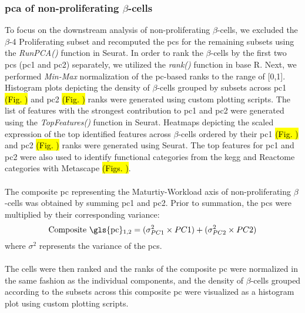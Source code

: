 \subsubsection{\large \gls{pca} of non-proliferating $\beta$-cells}
To focus on the downstream analysis of non-proliferating $\beta$-cells, we excluded the $\beta$-4 Proliferating subset and recomputed the \glspl{pc} for the remaining subsets using the \textit{RunPCA()} function in Seurat. In order to rank the $\beta$-cells by the first two \glspl{pc} (\gls{pc}1 and \gls{pc}2) separately, we utilized the \textit{rank()} function in base R. Next, we performed \textit{Min-Max} normalization of the \gls{pc}-based ranks to the range of [0,1]. Histogram plots depicting the density of $\beta$-cells grouped by subsets across \gls{pc}1 \hl{(Fig. )} and \gls{pc}2 \hl{(Fig. )} ranks were generated using custom plotting scripts. The list of features with the strongest contribution to  \gls{pc}1 and \gls{pc}2 were generated using the \textit{TopFeatures()} function in Seurat. Heatmaps depicting the scaled expression of the top identified features across $\beta$-cells ordered by their \gls{pc}1 \hl{(Fig. )} and \gls{pc}2 \hl{(Fig. )} ranks were generated using Seurat. The top features for \gls{pc}1 and \gls{pc}2 were also used to identify functional categories from the \gls{kegg} and Reactome categories with Metascape \textbf{\cite{zhou_metascape_2019}} \hl{(Figs. )}.\\\\
The composite \gls{pc} representing the Maturtiy-Workload axis of non-proliferating $\beta$-cells was obtained by summing \gls{pc}1 and \gls{pc}2. Prior to summation, the \glspl{pc} were multiplied by their corresponding variance:
\begin{equation}
    \text{Composite \gls{pc}\textsubscript{1,2}} = (\sigma^2_{PC1} \times PC1) + (\sigma^2_{PC2} \times PC2)
\end{equation}
where $\sigma^2$ represents the variance of the \glspl{pc}.\\\\
The cells were then ranked and the ranks of the composite \gls{pc} were normalized in the same fashion as the individual components, and the density of $\beta$-cells grouped according to the subsets across this composite \gls{pc} were visualized as a histogram plot using custom plotting scripts. 


